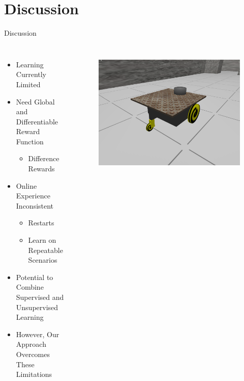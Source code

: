 \documentclass{beamer}
\begin{document}

\section{Discussion}

	\begin{frame}{Discussion}

		\begin{columns}[c c]		

		
		\begin{itemize}
				\item Learning Currently Limited
				\item Need Global and Differentiable Reward Function
					\begin{itemize}
						\item Difference Rewards
					\end{itemize}
				\item Online Experience Inconsistent
					\begin{itemize}
						\item Restarts
						\item Learn on Repeatable Scenarios
					\end{itemize}
				\item Potential to Combine Supervised and Unsupervised Learning
				\item However, Our Approach Overcomes These Limitations
		\end{itemize}


			\begin{figure}
				\includegraphics[width=\columnwidth]{robot1.png}
				\label{our_robot}
			\end{figure}


\end{columns}
\end{frame}
\end{document}
